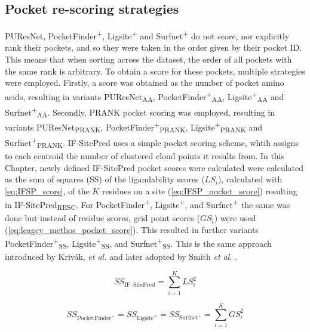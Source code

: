 \subsection{Pocket re-scoring strategies}

PUResNet, PocketFinder\textsuperscript{+}, Ligsite\textsuperscript{+} and Surfnet\textsuperscript{+} do not score, nor explicitly rank their pockets, and so they were taken in the order given by their pocket ID. This means that when sorting across the dataset, the order of all pockets with the same rank is arbitrary. To obtain a score for these pockets, multiple strategies were employed. Firstly, a score was obtained as the number of pocket amino acids, resulting in variants PUResNet\textsubscript{AA}, PocketFinder\textsuperscript{+}\textsubscript{AA}, Ligsite\textsuperscript{+}\textsubscript{AA} and Surfnet\textsuperscript{+}\textsubscript{AA}. Secondly, PRANK pocket scoring was employed, resulting in variants PUResNet\textsubscript{PRANK}, PocketFinder\textsuperscript{+}\textsubscript{PRANK}, Ligsite\textsuperscript{+}\textsubscript{PRANK} and Surfnet\textsuperscript{+}\textsubscript{PRANK}. IF-SitePred uses a simple pocket scoring scheme, whtih assigns to each centroid the number of clustered cloud points it results from. In this Chapter, newly defined IF-SitePred pocket scores were calculated were calculated as the sum of squares (SS) of the ligandability scores ($LS_{i}$), calculated with \autoref{eq:IFSP_score}, of the $K$ residues on a site (\autoref{eq:IFSP_pocket_score}) resulting in IF-SitePred\textsubscript{RESC}. For PocketFinder\textsuperscript{+}, Ligsite\textsuperscript{+}, and Surfnet\textsuperscript{+} the same was done but instead of residue scores, grid point scores ($GS_{i}$) were used (\autoref{eq:leagcy_methos_pocket_score}). This resulted in further variants PocketFinder\textsuperscript{+}\textsubscript{SS}, Ligsite\textsuperscript{+}\textsubscript{SS}, and Surfnet\textsuperscript{+}\textsubscript{SS}. This is the same approach introduced by Krivák, \textit{et al.} \cite{KRIVAK_2015_P2RANK} and later adopted by Smith \textit{et al.} \cite{SMITH_2024_GrASP}.

\begin{equation}
SS_{\text{IF--SitePred}} = \sum_{i=1}^{K} LS_i^2
\label{eq:IFSP_pocket_score}
\end{equation}

\begin{equation}
SS_{\text{PocketFinder}^+} = SS_{\text{Ligsite}^+} = SS_{\text{Surfnet}^+} = \sum_{i=1}^{K} GS_i^2
\label{eq:leagcy_methos_pocket_score}
\end{equation}

